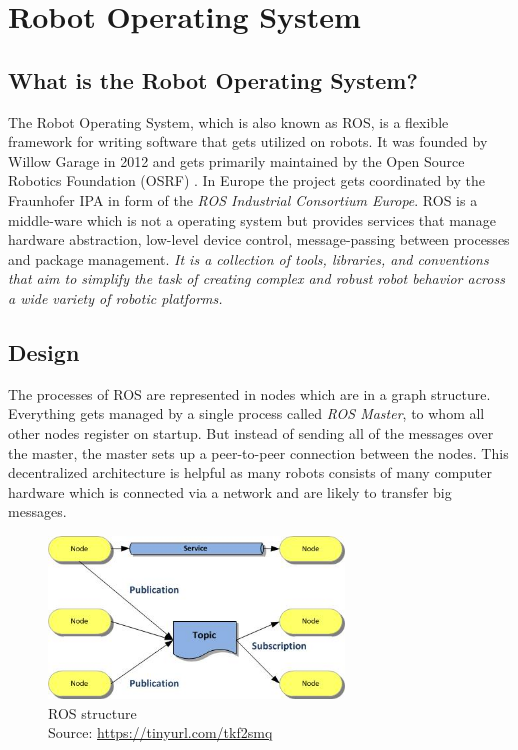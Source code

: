 
\chapter{Robot Operating System\authorA}

\section{What is the Robot Operating System?}
The Robot Operating System, which is also known as ROS, is a flexible framework for writing software that gets utilized on robots. It was founded by Willow Garage in 2012 and gets primarily maintained by the Open Source Robotics Foundation (OSRF) \cite{osrf}. In Europe the project gets coordinated by the Fraunhofer IPA in form of the \textit{ROS Industrial Consortium Europe}. ROS is a middle-ware which is not a operating system but provides services that manage hardware abstraction, low-level device control, message-passing between processes and package management. \emph{\glqq It is a collection of tools, libraries, and conventions that aim to simplify the task of creating complex and robust robot behavior across a wide variety of robotic platforms.\grqq}~\cite{aboutros}

\section{Design}
The processes of ROS are represented in nodes which are in a graph structure. Everything gets managed by a single process called \textit{ROS Master}, to whom all other nodes register on startup. But instead of sending all of the messages over the master, the master sets up a peer-to-peer connection between the nodes. This decentralized architecture is helpful as many robots consists of many computer hardware which is connected via a network and are likely to transfer big messages. \cite{rosoneoone}   \\
\begin{figure}[h]
	\centering
	\includegraphics[width=0.7\textwidth]{./media/images/ros_structure.jpg}
  	\caption{ROS structure
  	\\Source: \url{https://tinyurl.com/tkf2smq}}
  	\label{rosstructure}
\end{figure}


